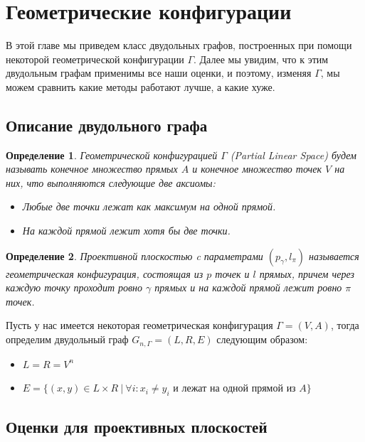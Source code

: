 \documentclass[a4paper]{article}
\newtheorem*{mdefinition}{Определение}
\begin{document}
\addtocounter{section}{1}
\section*{Геометрические конфигурации}
В этой главе мы приведем класс двудольных графов, построенных при помощи некоторой геометрической 
конфигурации $\Gamma$. Далее мы увидим, что к этим двудольным графам применимы все наши оценки, и поэтому, 
изменяя $\Gamma$, мы можем сравнить какие методы работают лучше, а какие хуже.

\setcounter{subsection}{0}
\subsection{Описание двудольного графа}
\begin{mdefinition}
    Геометрической конфигурацией $\Gamma$ (Partial Linear Space) будем называть конечное множество 
    прямых $A$ и конечное множество точек $V$ на них, что выполняются следующие две аксиомы:
    \begin{itemize}[noitemsep]
        \item Любые две точки лежат как максимум на одной прямой.
        \item На каждой прямой лежит хотя бы две точки.
    \end{itemize}
\end{mdefinition}

\begin{mdefinition}
    Проективной плоскостью c параметрами $(p_{\gamma}, l_{\pi})$ называется геометрическая конфигурация, 
    состоящая из $p$ точек и $l$ прямых, причем через каждую точку проходит ровно $\gamma$ прямых и на 
    каждой прямой лежит ровно $\pi$ точек. 
\end{mdefinition}

Пусть у нас имеется некоторая геометрическая конфигурация $\Gamma = (V, A)$, тогда определим двудольный 
граф $G_{n,\Gamma} = (L, R, E)$ следующим образом:
\begin{itemize}[noitemsep]
    \item $L = R = V^n$
    \item $E = \{(x, y)\in L\times R\ |\ \forall i: x_i \neq y_i$ и лежат на одной прямой из $A\}$
\end{itemize}

\subsection{Оценки для проективных плоскостей}
\end{document}
